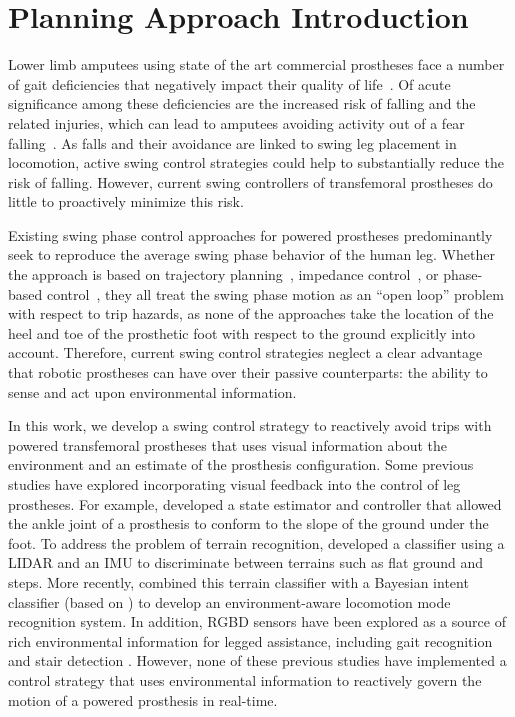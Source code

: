 \section{Planning Approach Introduction}
Lower limb amputees using state of the art commercial prostheses face a number
of gait deficiencies that negatively impact their quality of
life~\citep{gauthier1999enabling}. Of acute significance among these
deficiencies are the increased risk of falling and the related injuries, which
can lead to amputees avoiding activity out of a fear
falling~\citep{miller2001prevalence}.  As falls and their avoidance are linked
to swing leg placement in locomotion, active swing control strategies could help
to substantially reduce the risk of falling. However, current swing controllers
of transfemoral prostheses do little to proactively minimize this risk. 

Existing swing phase control approaches for powered prostheses predominantly
seek to reproduce the average swing phase behavior of the human leg. Whether the
approach is based on trajectory planning~\citep{lenzi2014speed}, impedance
control~\citep{sup2009preliminary}, or phase-based
control~\citep{quintero2016preliminary}, they all treat the swing phase motion
as an ``open loop'' problem with respect to trip hazards, as none of the
approaches take the location of the heel and toe of the prosthetic foot with
respect to the ground explicitly into account. Therefore, current swing control
strategies neglect a clear advantage that robotic prostheses can have over their
passive counterparts: the ability to sense and act upon environmental
information. 

In this work, we develop a swing control strategy to reactively avoid trips with
powered transfemoral prostheses that uses visual information about the
environment and an estimate of the prosthesis configuration. Some previous
studies have explored incorporating visual feedback into the control of leg
prostheses. For example, \citet{scandaroli2009estimation} developed a state
estimator and controller that allowed the ankle joint of a prosthesis to conform
to the slope of the ground under the foot. To address the problem of terrain
recognition, \citet{zhang2011preliminary} developed a classifier using a LIDAR
and an IMU to discriminate between terrains such as flat ground and steps. More
recently, \citet{liu2016development} combined this terrain classifier with a
Bayesian intent classifier (based on \citep{du2012toward}) to develop an
environment-aware locomotion mode recognition system. In addition, RGBD sensors
have been explored as a source of rich environmental information for legged
assistance, including gait recognition \citep{massalin2017user} and stair
detection \citep{krausz2015depth,duan2018real}. However, none of these previous
studies have implemented a control strategy that uses environmental
information to reactively govern the motion of a powered prosthesis in
real-time. 

